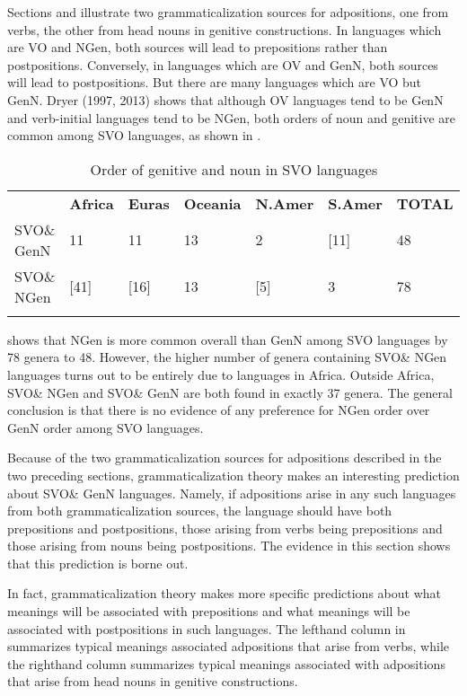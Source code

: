 \documentclass[output=paper]{langsci/langscibook}
\begin{document}
Sections  and  illustrate two grammaticalization sources for adpositions, one from verbs, the other from head nouns in genitive constructions. In languages which are VO and NGen, both sources will lead to prepositions rather than postpositions. Conversely, in languages which are OV and GenN, both sources will lead to postpositions. But there are many languages which are VO but GenN. Dryer (1997, 2013) shows that although OV languages tend to be GenN and verb-initial languages tend to be NGen, both orders of noun and genitive are common among SVO languages, as shown in .

\begin{table}
\begin{tabularx}{\textwidth}{XXXXXXX} 
\lsptoprule
& \bfseries Africa & \bfseries Euras & \bfseries Oceania & \bfseries N.Amer & \bfseries S.Amer & \bfseries TOTAL\\
SVO\& GenN & 11 & 11 & 13 & 2 & [11] & 48\\
SVO\& NGen & [41] & [16] & 13 & [5] & 3 & 78\\
\lspbottomrule
\end{tabularx}
\caption{\label{tab:dryer:5}Order of genitive and noun in SVO languages}
\end{table}


 shows that NGen is more common overall than GenN among SVO languages by 78 genera to 48. However, the higher number of genera containing SVO\& NGen languages turns out to be entirely due to languages in Africa. Outside Africa, SVO\& NGen and SVO\& GenN are both found in exactly 37 genera. The general conclusion is that there is no evidence of any preference for NGen order over GenN order among SVO languages.

Because of the two grammaticalization sources for adpositions described in the two preceding sections, grammaticalization theory makes an interesting prediction about SVO\& GenN languages. Namely, if adpositions arise in any such languages from both grammaticalization sources, the language should have both prepositions and postpositions, those arising from verbs being prepositions and those arising from nouns being postpositions. The evidence in this section shows that this prediction is borne out.

In fact, grammaticalization theory makes more specific predictions about what meanings will be associated with prepositions and what meanings will be associated with postpositions in such languages. The lefthand column in  summarizes typical meanings associated adpositions that arise from verbs, while the righthand column summarizes typical meanings associated with adpositions that arise from head nouns in genitive constructions.
\end{document}

